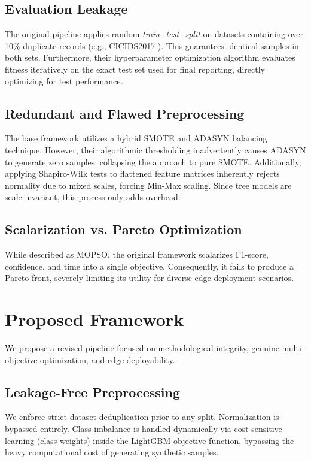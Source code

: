 \documentclass[journal, twocolumn]{IEEEtran}
\begin{document}
\subsection{Evaluation Leakage}
The original pipeline applies random \textit{train\_test\_split} on datasets containing over 10\% duplicate records (e.g., CICIDS2017 \cite{sharafaldin2018toward}). This guarantees identical samples in both sets. Furthermore, their hyperparameter optimization algorithm evaluates fitness iteratively on the exact test set used for final reporting, directly optimizing for test performance.

\subsection{Redundant and Flawed Preprocessing}
The base framework utilizes a hybrid SMOTE and ADASYN balancing technique. However, their algorithmic thresholding inadvertently causes ADASYN to generate zero samples, collapsing the approach to pure SMOTE. Additionally, applying Shapiro-Wilk tests to flattened feature matrices inherently rejects normality due to mixed scales, forcing Min-Max scaling. Since tree models are scale-invariant, this process only adds overhead.

\subsection{Scalarization vs. Pareto Optimization}
While described as MOPSO, the original framework scalarizes F1-score, confidence, and time into a single objective. Consequently, it fails to produce a Pareto front, severely limiting its utility for diverse edge deployment scenarios.

\section{Proposed Framework}
We propose a revised pipeline focused on methodological integrity, genuine multi-objective optimization, and edge-deployability.

\subsection{Leakage-Free Preprocessing}
We enforce strict dataset deduplication prior to any split. Normalization is bypassed entirely. Class imbalance is handled dynamically via cost-sensitive learning (class weights) inside the LightGBM objective function, bypassing the heavy computational cost of generating synthetic samples.
\end{document}
